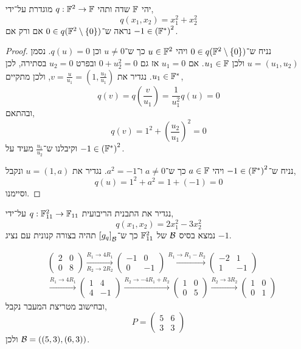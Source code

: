 \question{}
יהי $\mathbb{F}$ שדה ותהי $q : \mathbb{F}^2 \to \mathbb{F}$ מוגדרת על־ידי,
\[
	q(x_1, x_2)
	= x_1^2 + x_2^2
\]
נראה ש־$0 \in q(\mathbb{F}^2 \setminus \{ 0 \})$ אם ורק אם $-1 \in {(\mathbb{F}^*)}^2$.
\begin{proof}
	נניח ש־$0 \in q(\mathbb{F}^2 \setminus \{ 0 \})$ ויהי $u \in \mathbb{F}^2$ כך ש־$u \ne 0$ וכן $q(u) = 0$.
	נסמן $u = (u_1, u_2)$ ולכן $u_1 \in \mathbb{F}$. אם $u_1 = 0$ אז גם $0 + u_2^2 = 0$ ובפרט $u_2 = 0$ בסתירה, לכן $u_1 \in \mathbb{F}^*$.
	נגדיר את $v = \frac{u}{u_1} = (1, \frac{u_2}{u_1})$, ולכן מתקיים,
	\[
		q(v)
		= q(\frac{v}{u_1})
		= \frac{1}{u_1^2} q(u)
		= 0
	\]
	ובהתאם,
	\[
		q(v)
		= 1^2 + {(\frac{u_2}{u_1})}^2
		= 0
	\]
	וקיבלנו ש־$\frac{u_1}{u_2}$ מעיד על $-1 \in {(\mathbb{F}^*)}^2$.

	נניח ש־$-1 \in {(\mathbb{F}^*)}^2$ ויהי $a \in \mathbb{F}$ כך ש־$a \ne 0$ ו־$a^2 = -1$.
	נגדיר את $u = (1, a)$ ונקבל,
	\[
		q(u)
		= 1^2 + a^2
		= 1 + (-1)
		= 0
	\]
	וסיימנו.
\end{proof}

\question{}
נגדיר את התבנית הריבועית $q : \mathbb{F}_{11}^2 \to \mathbb{F}_{11}$ על־ידי,
\[
	q(x_1, x_2)
	= 2 x_1^2 - 3 x_2^2
\]
נמצא בסיס $\mathcal{B}$ של $\mathbb{F}_{11}^2$ כך ש־${[g_q]}_{\mathcal{B}}$ תהיה בצורה קנונית עם נציג $-1$.
\begin{solution}
	\begin{align*}
		& \begin{pmatrix}
			2 & 0 \\
			0 & 8
		\end{pmatrix}
		\xrightarrow[R_2 \to 2 R_2]{R_1 \to 4 R_1}
		\begin{pmatrix}
			-1 & 0 \\
			0 & -1
		\end{pmatrix}
		\xrightarrow{R_1 \to R_1 - R_2}
		\begin{pmatrix}
			-2 & 1 \\
			1 & -1
		\end{pmatrix} \\
		& \xrightarrow{R_1 \to 4 R_1}
		\begin{pmatrix}
			1 & 4 \\
			4 & -1
		\end{pmatrix}
		\xrightarrow{R_2 \to -4 R_1 + R_2}
		\begin{pmatrix}
			1 & 0 \\
			0 & 5
		\end{pmatrix}
		\xrightarrow{R_2 \to 3 R_2}
		\begin{pmatrix}
			1 & 0 \\
			0 & 1
		\end{pmatrix}
	\end{align*}
	ובחישוב מטריצת המעבר נקבל,
	\[
		P
		= \begin{pmatrix}
			5 & 6 \\
			3 & 3
		\end{pmatrix}
	\]
	ולכן $\mathcal{B} = ((5, 3), (6, 3))$.
\end{solution}

